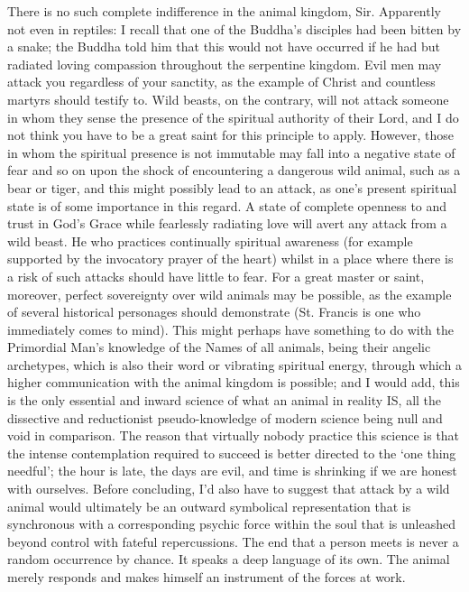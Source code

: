 \begin{footnotesize}
\begin{sffamily}
There is no such complete indifference in the animal kingdom, Sir. Apparently not even in reptiles: I recall that one of the Buddha's disciples had been bitten by a snake; the Buddha told him that this would not have occurred if he had but radiated loving compassion throughout the serpentine kingdom. Evil men may attack you regardless of your sanctity, as the example of Christ and countless martyrs should testify to. Wild beasts, on the contrary, will not attack someone in whom they sense the presence of the spiritual authority of their Lord, and I do not think you have to be a great saint for this principle to apply. However, those in whom the spiritual presence is not immutable may fall into a negative state of fear and so on upon the shock of encountering a dangerous wild animal, such as a bear or tiger, and this might possibly lead to an attack, as one's present spiritual state is of some importance in this regard. A state of complete openness to and trust in God's Grace while fearlessly radiating love will avert any attack from a wild beast. He who practices continually spiritual awareness (for example supported by the invocatory prayer of the heart) whilst in a place where there is a risk of such attacks should have little to fear. For a great master or saint, moreover, perfect sovereignty over wild animals may be possible, as the example of several historical personages should demonstrate (St. Francis is one who immediately comes to mind). This might perhaps have something to do with the Primordial Man's knowledge of the Names of all animals, being their angelic archetypes, which is also their word or vibrating spiritual energy, through which a higher communication with the animal kingdom is possible; and I would add, this is the only essential and inward science of what an animal in reality IS, all the dissective and reductionist pseudo-knowledge of modern science being null and void in comparison. The reason that virtually nobody practice this science is that the intense contemplation required to succeed is better directed to the `one thing needful'; the hour is late, the days are evil, and time is shrinking if we are honest with ourselves. Before concluding, I'd also have to suggest that attack by a wild animal would ultimately be an outward symbolical representation that is synchronous with a corresponding psychic force within the soul that is unleashed beyond control with fateful repercussions. The end that a person meets is never a random occurrence by chance. It speaks a deep language of its own. The animal merely responds and makes himself an instrument of the forces at work.

\end{sffamily}
\end{footnotesize}

